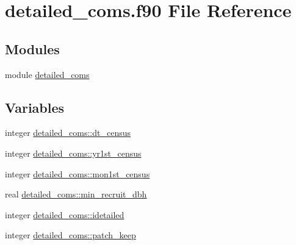 \hypertarget{detailed__coms_8f90}{}\section{detailed\+\_\+coms.\+f90 File Reference}
\label{detailed__coms_8f90}
\subsection*{Modules}
\begin{DoxyCompactItemize}
\item 
module \hyperlink{namespacedetailed__coms}{detailed\+\_\+coms}
\end{DoxyCompactItemize}
\subsection*{Variables}
\begin{DoxyCompactItemize}
\item 
integer \hyperlink{namespacedetailed__coms_a5d3b59a9d43ec5865a4be92ffdde1982}{detailed\+\_\+coms\+::dt\+\_\+census}
\item 
integer \hyperlink{namespacedetailed__coms_ad52c2a6c02170c71e22316df2c842b91}{detailed\+\_\+coms\+::yr1st\+\_\+census}
\item 
integer \hyperlink{namespacedetailed__coms_a7101fa67abae725580d0c44df3fd9845}{detailed\+\_\+coms\+::mon1st\+\_\+census}
\item 
real \hyperlink{namespacedetailed__coms_af27afe5cb99befa2f9c910987d214757}{detailed\+\_\+coms\+::min\+\_\+recruit\+\_\+dbh}
\item 
integer \hyperlink{namespacedetailed__coms_a600c197b688f861519c7fc669706c166}{detailed\+\_\+coms\+::idetailed}
\item 
integer \hyperlink{namespacedetailed__coms_a6541b50f2722b8a83448571dc25934aa}{detailed\+\_\+coms\+::patch\+\_\+keep}
\end{DoxyCompactItemize}
